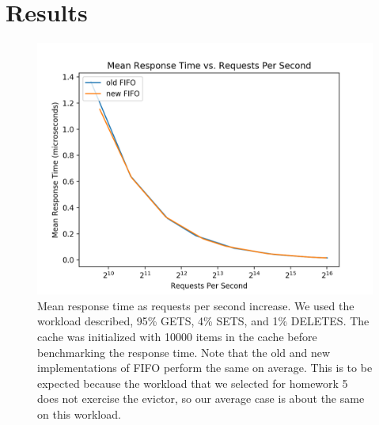 \documentclass[12pt]{article}
\begin{document}
\section{Results}
\bigskip 

\begin{figure}
\centering
\includegraphics[scale=0.75]{reqs_per_sec_newold.png}
\caption{Mean response time as requests per second increase. We used the workload described, 95\% GETS, 4\% SETS, and 1\% DELETES. The cache was initialized with 10000 items in the cache before benchmarking the response time. Note that the old and new implementations of FIFO perform the same on average. This is to be expected because the workload that we selected for homework 5 does not exercise the evictor, so our average case is about the same on this workload.}
\end{figure}
\end{document}
